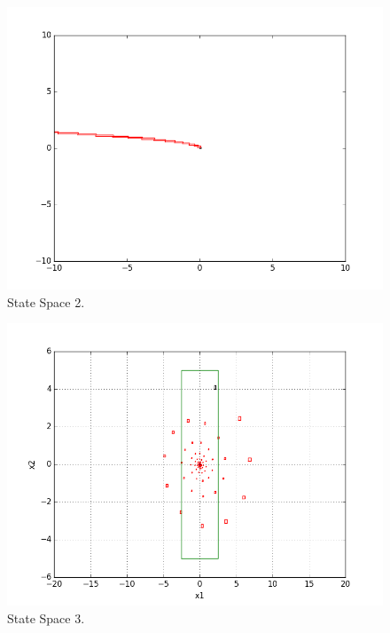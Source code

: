 \documentclass[a4paper,12pt]{book}
\begin{document}
    \begin{figure}
        \includegraphics[width=\linewidth]{2.png}
        \caption{State Space 2.}
        \label{fig:1}
    \end{figure}


    \begin{figure}
        \includegraphics[width=\linewidth]{3.png}
        \caption{State Space 3.}
        \label{fig:1}
    \end{figure}
\end{document}
